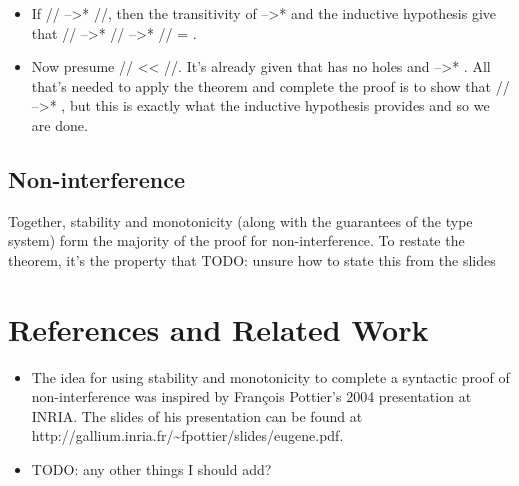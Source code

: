 \documentclass[12pt]{report}
\begin{document}
\begin{itemize}
\item  If // -->* //, then the transitivity of -->* and the
      inductive hypothesis give that // -->* // -->* //
      = .



\item  Now presume // << //. It's already given that  has
      no holes and  -->* . All that's needed to apply the
       theorem and complete the proof is to show that
      // -->* , but this is exactly what the inductive
      hypothesis provides and so we are done.

\end{itemize}




\subsection{Non-interference}



 Together, stability and monotonicity (along with the guarantees
of the type system) form the majority of the proof for
non-interference. To restate the theorem, it's the property that
TODO: unsure how to state this from the slides 

\section{References and Related Work}






\begin{itemize}
\item  The idea for using stability and monotonicity to complete
  a syntactic proof of non-interference was inspired by François
  Pottier's 2004 presentation at INRIA.  The slides of his
  presentation can be found at
  http://gallium.inria.fr/\~{}fpottier/slides/eugene.pdf.



\item  TODO: any other things I should add?



\end{itemize}


\begin{coqdoccode}
\coqdocemptyline
\coqdocemptyline
\end{coqdoccode}
\end{document}
